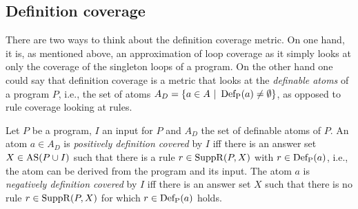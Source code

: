 \begin{comment}
    - loops play an important role in ASP as seen in (source). Therefore constructing a coverage metric that focuses on them makes sense        \/
    
    - Definition + example      \/
    
    - generally number of loops in a program in exponential in the number of rules -> expensive to compute! -> introduce 2 more coverage metrics that approximate loop coverage! (one for minimal (singleton) loops and one for maximal loops (strongyl connected components))      \/
    
    (- no real relation to rule coverage (neither implies the other)
    
    - total program coverage implies total loop coverage -> not so relevant but maybe interesting to mention?)
\end{comment}

\subsection{Definition coverage}
\label{subsec:Coverage metrics/Branch-like coverage/Definition coverage}
There are two ways to think about the definition coverage metric. On one hand, it is, as mentioned above, an approximation of loop coverage as it simply looks at only the coverage of the singleton loops of a program. On the other hand one could say that definition coverage is a metric that looks at the \emph{definable atoms} of a program $P$, i.e., the set of atoms \(A_D = \{a \in A \ | \ \Def(a) \neq \emptyset\}\), as opposed to rule coverage looking at rules.

\begin{definition}
\label{def:definition coverage}
    Let $P$ be a program, $I$ an input for $P$ and $A_D$ the set of definable atoms of $P$. An atom \(a \in A_D\) is \emph{positively definition covered} by $I$ iff there is an answer set \(X \in \operatorname{AS}(P \cup I)\) such that there is a rule \(r \in \operatorname{SuppR}(P, X)\) with \(r \in \operatorname{Def_P}(a)\), i.e., the atom can be derived from the program and its input.
    The atom $a$ is \emph{negatively definition covered} by $I$ iff there is an answer set $X$ such that there is no rule \(r \in \operatorname{SuppR}(P, X)\) for which \(r \in \operatorname{Def_P}(a)\) holds.
\end{definition}


